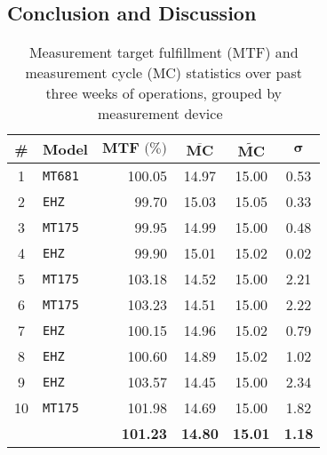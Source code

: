 \begin{appendices}
\FloatBarrier


\chapter{Conclusion and Discussion}
\label{app:conclusion}

\begin{table}[hbt]
	\centering
  	\begin{tabularx}{\textwidth}{|c|X|r|c|c|c|}
		\hline
		\textbf{\#} & \textbf{Model} & $\textbf{MTF~(\%)}$ & ${\overline{\textbf{MC}}}$ & $\widetilde{\textbf{MC}}$ & $\boldsymbol{\sigma}$ \\
	    	\hline
	    1 	& \texttt{MT681} 	& 100.05 	& 14.97 & 15.00 & 0.53 \\ %
	    	\hline
	    	2 	& \texttt{EHZ}		& 99.70	 	& 15.03 & 15.05 & 0.33 \\ %
	    	\hline
	    	3 	& \texttt{MT175}	& 99.95 	& 14.99 & 15.00 & 0.48 \\ %
	    \hline
	    	4 	& \texttt{EHZ}		& 99.90 	& 15.01 & 15.02 & 0.02 \\ %
	    	\hline
	    5 	& \texttt{MT175}	& 103.18 	& 14.52 & 15.00 & 2.21 \\ %
	    	6 	& \texttt{MT175}	& 103.23 	& 14.51 & 15.00 & 2.22 \\ %
	    	\hline
	    7 	& \texttt{EHZ}		& 100.15 	& 14.96 & 15.02 & 0.79 \\ %
	    \hline
	    	8 	& \texttt{EHZ}		& 100.60 	& 14.89 & 15.02 & 1.02 \\ %
	    	\hline
	    9 	& \texttt{EHZ} 		& 103.57 	& 14.45 & 15.00 & 2.34 \\ %
	    	10 	& \texttt{MT175}	& 101.98 	& 14.69 & 15.00 & 1.82 \\ %
	    	\hline
	    	\hline
	    	& & \textbf{101.23} & \textbf{14.80} & \textbf{15.01} & \textbf{1.18}  \\
	    	\hline
	\end{tabularx}
  	\caption[Measurement statistics, grouped by measurement device]{Measurement target fulfillment ($\text{MTF}$) and measurement cycle ($\text{MC}$) statistics over past three weeks of operations, grouped by measurement device~\footnotemark}
  	\label{tab:measurement-cycle-statistics}
\end{table}


\end{appendices}
